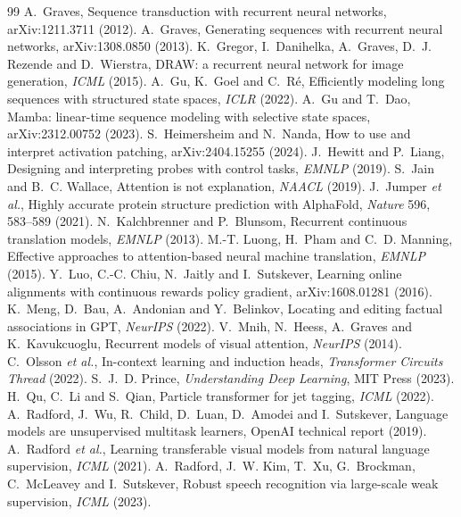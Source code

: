 \documentclass[11pt]{article}
\begin{document}
\begin{thebibliography}{99}
 A.~Graves, Sequence transduction with recurrent neural networks, arXiv:1211.3711 (2012).
 A.~Graves, Generating sequences with recurrent neural networks, arXiv:1308.0850 (2013).
 K.~Gregor, I.~Danihelka, A.~Graves, D.~J. Rezende and D.~Wierstra, DRAW: a recurrent neural network for image generation, \emph{ICML} (2015).
 A.~Gu, K.~Goel and C.~Ré, Efficiently modeling long sequences with structured state spaces, \emph{ICLR} (2022).
 A.~Gu and T.~Dao, Mamba: linear-time sequence modeling with selective state spaces, arXiv:2312.00752 (2023).
 S.~Heimersheim and N.~Nanda, How to use and interpret activation patching, arXiv:2404.15255 (2024).
 J.~Hewitt and P.~Liang, Designing and interpreting probes with control tasks, \emph{EMNLP} (2019).
 S.~Jain and B.~C. Wallace, Attention is not explanation, \emph{NAACL} (2019).
 J.~Jumper \emph{et al.}, Highly accurate protein structure prediction with AlphaFold, \emph{Nature} 596, 583--589 (2021).
 N.~Kalchbrenner and P.~Blunsom, Recurrent continuous translation models, \emph{EMNLP} (2013).
 M.-T. Luong, H.~Pham and C.~D. Manning, Effective approaches to attention-based neural machine translation, \emph{EMNLP} (2015).
 Y.~Luo, C.-C. Chiu, N.~Jaitly and I.~Sutskever, Learning online alignments with continuous rewards policy gradient, arXiv:1608.01281 (2016).
 K.~Meng, D.~Bau, A.~Andonian and Y.~Belinkov, Locating and editing factual associations in GPT, \emph{NeurIPS} (2022).
 V.~Mnih, N.~Heess, A.~Graves and K.~Kavukcuoglu, Recurrent models of visual attention, \emph{NeurIPS} (2014).
 C.~Olsson \emph{et al.}, In-context learning and induction heads, \emph{Transformer Circuits Thread} (2022).
 S.~J.~D. Prince, \emph{Understanding Deep Learning}, MIT Press (2023).
 H.~Qu, C.~Li and S.~Qian, Particle transformer for jet tagging, \emph{ICML} (2022).
 A.~Radford, J.~Wu, R.~Child, D.~Luan, D.~Amodei and I.~Sutskever, Language models are unsupervised multitask learners, OpenAI technical report (2019).
 A.~Radford \emph{et al.}, Learning transferable visual models from natural language supervision, \emph{ICML} (2021).
 A.~Radford, J.~W. Kim, T.~Xu, G.~Brockman, C.~McLeavey and I.~Sutskever, Robust speech recognition via large-scale weak supervision, \emph{ICML} (2023).

\end{thebibliography}
\end{document}
